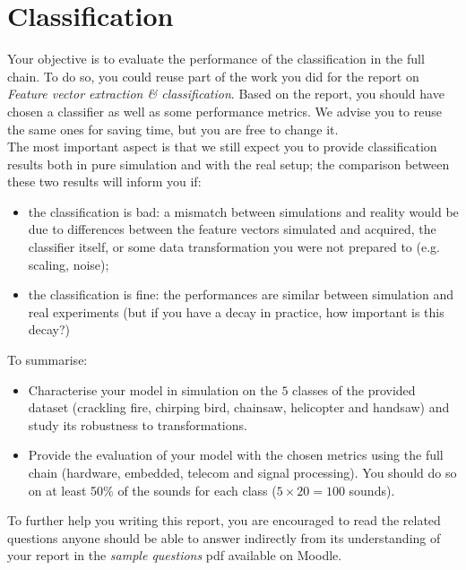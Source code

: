 \section{Classification}

Your objective is to evaluate the performance of the classification in the full chain. To do so, you could reuse part of the work you did for
the report on \emph{Feature vector extraction \& classification}.
Based on the report, you should have chosen a classifier as well as some performance metrics.
We advise you to reuse the same ones for saving time, but you are free to change it.  \\
The most important aspect is that we still expect you to provide classification results both in pure simulation and with the real setup; the comparison between these two results will inform you if:
\begin{itemize}
    \item the classification is bad: a mismatch between simulations and reality would be due to differences between the feature vectors simulated and acquired, the classifier itself, or some data transformation you were not prepared to (e.g. scaling, noise);
    \item the classification is fine: the performances are similar between simulation and real experiments (but if you have a decay in practice, how important is this decay?)
\end{itemize}

To summarise:
\begin{itemize}
    \item Characterise your model in simulation on the $5$ classes of the provided dataset (crackling fire, chirping bird, chainsaw, helicopter and handsaw) and study its robustness to transformations.
    \item Provide the evaluation of your model with the chosen metrics using the full chain (hardware, embedded, telecom and signal processing). You should do so on at least 50\% of the sounds for each class ($5 \times 20=100$ sounds).
\end{itemize}

To further help you writing this report, you are encouraged to read the related questions anyone should be able to answer indirectly from its understanding of your report in the \emph{sample questions} pdf available on Moodle.

